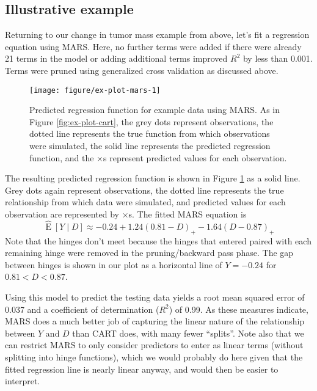 \documentclass[12pt]{article}
\begin{document}

\subsection{Illustrative example} %
\label{sub:mars-ex}

Returning to our change in tumor mass example from above, let's fit a regression equation using MARS. Here, no further terms were added if there were already 21 terms in the model or adding additional terms improved $R^2$ by less than 0.001. Terms were pruned using generalized cross validation as discussed above.

\begin{figure}[!htbp]
\centering
  \texttt{[image: figure/ex-plot-mars-1]}

\caption[Predicted regression function for example data using MARS.]{Predicted regression function for example data using MARS. As in Figure \ref{fig:ex-plot-cart}, the grey dots represent observations, the dotted line represents the true function from which observations were simulated, the solid line represents the predicted regression function, and the $\times$s represent predicted values for each observation.}\label{fig:ex-plot-mars}
\end{figure}

The resulting predicted regression function is shown in Figure \ref{fig:ex-plot-mars} as a solid line. Grey dots again represent observations, the dotted line represents the true relationship from which data were simulated, and predicted values for each observation are represented by $\times$s. The fitted MARS equation is
\begin{equation}
  \label{eq:mars-eqn}
  \hat{\operatorname{E}}[Y \mid D] \approx -0.24 + 1.24 (0.81 - D)_{+} -1.64 (D - 0.87)_{+}
\end{equation}
Note that the hinges don't meet because the hinges that entered paired with each remaining hinge were removed in the pruning/backward pass phase. The gap between hinges is shown in our plot as a horizontal line of $Y = -0.24$ for $0.81 < D < 0.87$.

Using this model to predict the testing data yields a root mean squared error of 0.037 and a coefficient of determination ($R^2$) of 0.99. As these measures indicate, MARS does a much better job of capturing the linear nature of the relationship between $Y$ and $D$ than CART does, with many fewer ``splits''. Note also that we can restrict MARS to only consider predictors to enter as linear terms (without splitting into hinge functions), which we would probably do here given that the fitted regression line is nearly linear anyway, and would then be easier to interpret.
\end{document}
